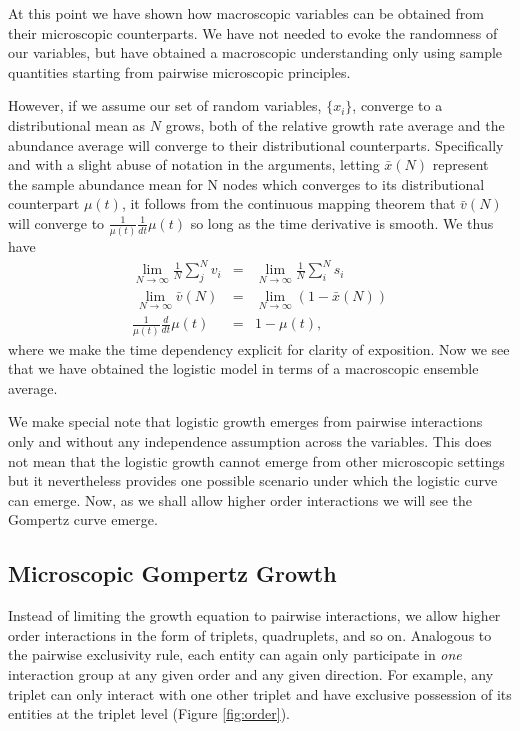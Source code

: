 \documentclass{article}
\begin{document}
At this point we have shown how macroscopic variables can be obtained from their microscopic counterparts. We have not needed to evoke the randomness of our variables, but have obtained a macroscopic understanding only using sample quantities starting from pairwise microscopic principles. 

However, if we assume our set of random variables, $\{x_i\}$, converge to a distributional mean as $N$ grows, both of the relative growth rate average and the abundance average will converge to their distributional counterparts. Specifically and with a slight abuse of notation in the arguments, letting $\bar{x}(N)$ represent the sample abundance mean for N nodes which converges to its distributional counterpart $\mu(t)$, it follows from the continuous mapping theorem that $\bar{v}(N)$ will converge to $\frac{1}{\mu(t)}\frac{1}{dt}\mu(t)$ so long as the time derivative is smooth. We thus have
\begin{eqnarray*}
  \lim_{N\rightarrow \infty} \frac{1}{N}\sum_j^N v_i &=& \lim_{N\rightarrow \infty} \frac{1}{N}\sum_i^N s_i \\\
  \lim_{N\rightarrow \infty} \bar{v}(N) &=& \lim_{N\rightarrow \infty}(1 - \bar{x}(N)) \\
   \frac{1}{\mu(t)}\frac{d}{dt}\mu(t) &=&1 - \mu(t),
\end{eqnarray*}
where we make the time dependency explicit for clarity of exposition. Now we see that we have obtained the logistic model in terms of a macroscopic ensemble average.

We make special note that logistic growth emerges from pairwise interactions only and without any independence assumption across the variables. This does not mean that the logistic growth cannot emerge from other microscopic settings but it nevertheless provides one possible scenario under which the logistic curve can emerge. Now, as we shall allow higher order interactions we will see the Gompertz curve emerge.

\subsection{Microscopic Gompertz Growth}
\label{sec:microGomp}

Instead of limiting the growth equation to pairwise interactions, we allow higher order interactions in the form of triplets, quadruplets, and so on. Analogous to the pairwise exclusivity rule, each entity can again only participate in \textit{one} interaction group at any given order and any given direction. For example, any triplet can only interact with one other triplet and have exclusive possession of its entities at the triplet level (Figure \ref{fig:order}).
\end{document}
